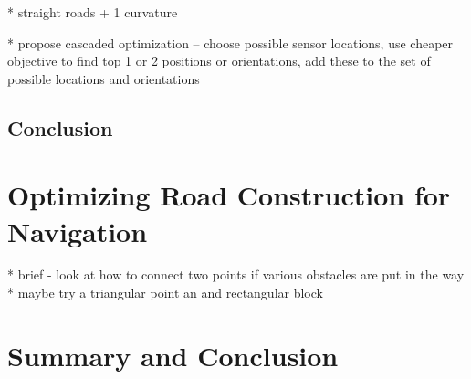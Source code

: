 \documentclass[a4paper,12pt,twoside,openright]{report}
\begin{document}
* straight roads + 1 curvature

* propose cascaded optimization -- choose possible sensor locations, use cheaper objective to find top 1 or 2 
positions or orientations, add these to the set of possible locations and orientations



\section{Conclusion}

\chapter{Optimizing Road Construction for Navigation}

* brief - look at how to connect two points if various obstacles are put in the way
* maybe try a triangular point an and rectangular block 


\chapter{Summary and Conclusion} 




\appendix
\singlespacing

\printbibliography
\end{document}
